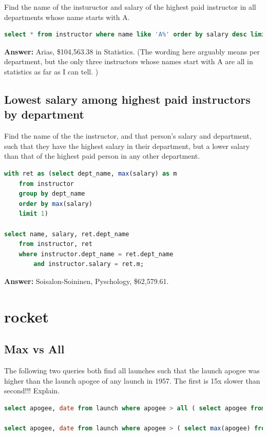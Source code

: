 \documentclass[11pt, oneside]{amsart}   	%
\begin{document}
Find the name of the instuructor and salary of the highest paid instructor in all departments whose name starts with A.
\begin{lstlisting}[language=SQL]
    select * from instructor where name like 'A%' order by salary desc limit 1;
\end{lstlisting}

\textbf{Answer: } Arias, \$104,563.38 in Statistics. (The wording here arguably means per department, but the only three instructors whose names start with A are all in statistics as far as I can tell. )

\subsection{Lowest salary among highest paid instructors by department}
Find the name of the the instructor, and that person's salary and department, such that they have the highest salary in their department, but a lower salary than that of the highest paid person in any other department.

\begin{lstlisting}[language=SQL]
with ret as (select dept_name, max(salary) as m 
    from instructor 
    group by dept_name 
    order by max(salary)
    limit 1)

select name, salary, ret.dept_name 
    from instructor, ret 
    where instructor.dept_name = ret.dept_name 
        and instructor.salary = ret.m;
\end{lstlisting}
\textbf{Answer: } Soisalon-Soininen, Pyschology, \$62,579.61.


\section{rocket}

\subsection{Max vs All} 
The following two queries both find all launches such that the launch apogee was higher than the launch apogee of any launch in 1957. The first is 15x slower than second!!! Explain.

\begin{lstlisting}[language=SQL]
select apogee, date from launch where apogee > all ( select apogee from launch where date_part('year', date)=1957);

select apogee, date from launch where apogee > ( select max(apogee) from launch where date_part('year', date)=1957);
\end{lstlisting}
            
\end{document}
